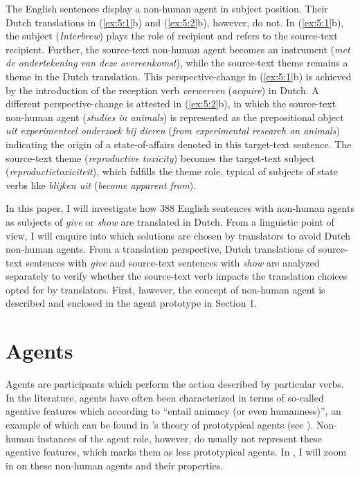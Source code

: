 \documentclass[output=paper]{LSP/langsci}
\begin{document}

The English sentences display a non-human agent in subject position. Their Dutch translations in (\ref{ex:5:1}b) and (\ref{ex:5:2}b), however, do not. In (\ref{ex:5:1}b), the subject (\textit{Interbrew}) plays the role of recipient and refers to the source-text recipient. Further, the source-text non-human agent becomes an instrument (\textit{met de ondertekening van deze overeenkomst}), while the source-text theme remains a theme in the Dutch translation. This perspective-change in (\ref{ex:5:1}b) is achieved by the introduction of the reception verb \textit{verwerven} (\textit{acquire}) in Dutch. A different perspective-change is attested in (\ref{ex:5:2}b), in which the source-text non-human agent (\textit{studies in animals}) is represented as the prepositional object \textit{uit experimenteel onderzoek bij dieren} (\textit{from experimental research on animals}) indicating the origin of a state-of-affairs denoted in this target-text sentence. The source-text theme (\textit{reproductive toxicity}) becomes the target-text subject (\textit{reproductietoxiciteit}), which fulfills the theme role, typical of subjects of state verbs like \textit{blijken uit} (\textit{become apparent from}).

In this paper, I will investigate how 388 English sentences with non-human agents as subjects of \textit{give} or \textit{show} are translated in Dutch. From a linguistic point of view, I will enquire into which solutions are chosen by translators to avoid Dutch non-human agents. From a translation perspective, Dutch translations of source-text sentences with \textit{give} and source-text sentences with \textit{show} are analyzed separately to verify whether the source-text verb impacts the translation choices opted for by translators. First, however, the concept of non-human agent is described and enclosed in the agent prototype in Section 1. 

\section{Agents} \label{sec:5:2}

Agents are participants which perform the action described by particular verbs. In the literature, agents have often been characterized in terms of so-called agentive features which according to \citet[49]{Hundt2004} “entail animacy (or even humanness)”, an example of which can be found in \citeauthor{Dowty1991}'s \citeyear{Dowty1991} theory of prototypical agents (see ). Non-human instances of the agent role, however, do usually not represent these agentive features, which marks them as less prototypical agents. In , I will zoom in on these non-human agents and their properties. 
\end{document}
